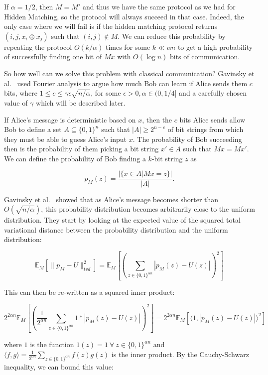 \documentclass[a4paper]{article}
\begin{document}
        If $\alpha = 1/2$, then $M = M'$ and thus we have the same protocol as we had for Hidden Matching, so the protocol will always succeed in that case. Indeed, the only case where we will fail is if the hidden matching protocol returns $(i, j, x_i \oplus x_j)$ such that $(i, j) \notin M$. We can reduce this probability by repeating the protocol $O(k/\alpha)$ times for some $k \ll \alpha n$ to get a high probability of successfully finding one bit of $Mx$ with $O(\log n)$ bits of communication.

        So how well can we solve this problem with classical communication? Gavinsky et al.~\cite{Gavinsky:2007:ESO:1250790.1250866} used Fourier analysis to argue how much Bob can learn if Alice sends them $c$ bits, where $1 \leq c \leq \gamma \epsilon\sqrt{n/\alpha}$, for some $\epsilon > 0, \alpha \in (0,1/4]$ and a carefully chosen value of $\gamma$ which will be described later.

        If Alice's message is deterministic based on $x$, then the $c$ bits Alice sends allow Bob to define a set $A \subseteq \{0, 1\}^n$ such that $|A| \geq 2^{n-c}$ of bit strings from which they must be able to guess Alice's input $x$. The probability of Bob succeeding then is the probability of them picking a bit string $x' \in A$ such that $Mx = Mx'$. We can define the probability of Bob finding a $k$-bit string $z$ as

        $$p_M(z) = \frac{|\{x \in A|Mx = z\}|}{|A|}.$$

        Gavinsky et al.~ showed that as Alice's message becomes shorter than $O(\sqrt{n/\alpha})$, this probability distribution becomes arbitrarily close to the uniform distribution. They start by looking at the expected value of the squared total variational distance between the probability distribution and the uniform distribution:

        $$\mathbb{E}_M[\|p_M - U\|_{tvd}^2] = \mathbb{E}_M[(\sum_{z \in \{0, 1\}^{\alpha n}}|p_M(z) - U(z)|)^2]$$

        This can then be re-written as a squared inner product:

        $$2^{2\alpha n}\mathbb{E}_M\left[\left(\frac{1}{2^{\alpha n}}\sum_{z \in \{0, 1\}^{\alpha n}}1 * |p_M(z) - U(z)|\right)^2\right] = 2^{2\alpha n}\mathbb{E}_M[\langle 1, |p_M(z) - U(z)|\rangle^2]$$

        where $1$ is the function $1(z) = 1~\forall~z\in\{0, 1\}^{\alpha n}$ and $\langle f, g\rangle = \frac{1}{2^{\alpha n}}\sum_{z \in \{0, 1\}^{\alpha n}}f(z)g(z)$ is the inner product. By the Cauchy-Schwarz inequality, we can bound this value:
\end{document}
